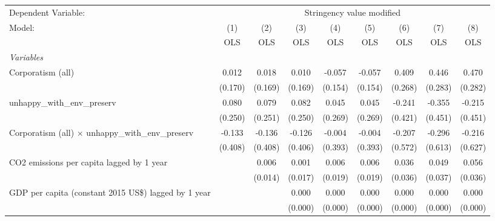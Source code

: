 
\begingroup
\centering
\begin{tabular}{lcccccccc}
   \toprule
   Dependent Variable: & \multicolumn{8}{c}{Stringency value modified}\\
   Model:                                                     & (1)     & (2)     & (3)     & (4)     & (5)     & (6)           & (7)          & (8)\\  
                                                              &  OLS    & OLS     & OLS     & OLS     & OLS     & OLS           & OLS          & OLS\\  
   \midrule
   \emph{Variables}\\
   Corporatism (all)                                          & 0.012   & 0.018   & 0.010   & -0.057  & -0.057  & 0.409         & 0.446        & 0.470\\   
                                                              & (0.170) & (0.169) & (0.169) & (0.154) & (0.154) & (0.268)       & (0.283)      & (0.282)\\   
   unhappy\_with\_env\_preserv                                & 0.080   & 0.079   & 0.082   & 0.045   & 0.045   & -0.241        & -0.355       & -0.215\\   
                                                              & (0.250) & (0.251) & (0.250) & (0.269) & (0.269) & (0.421)       & (0.451)      & (0.451)\\   
   Corporatism (all) $\times$ unhappy\_with\_env\_preserv     & -0.133  & -0.136  & -0.126  & -0.004  & -0.004  & -0.207        & -0.296       & -0.216\\   
                                                              & (0.408) & (0.408) & (0.406) & (0.393) & (0.393) & (0.572)       & (0.613)      & (0.627)\\   
   CO2 emissions per capita lagged by 1 year                  &         & 0.006   & 0.001   & 0.006   & 0.006   & 0.036         & 0.049        & 0.056\\   
                                                              &         & (0.014) & (0.017) & (0.019) & (0.019) & (0.036)       & (0.037)      & (0.036)\\   
   GDP per capita (constant 2015 US\$) lagged by 1 year       &         &         & 0.000   & 0.000   & 0.000   & 0.000         & 0.000        & 0.000\\   
                                                              &         &         & (0.000) & (0.000) & (0.000) & (0.000)       & (0.000)      & (0.000)\\   

\end{tabular}
